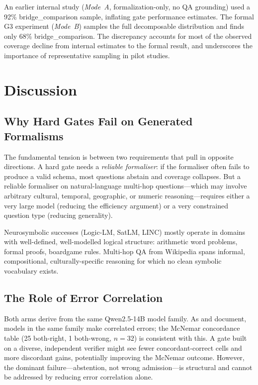 \documentclass[11pt]{article}
\newcommand{\mcnem}{McNemar}
\begin{document}
An earlier internal study (\emph{Mode~A}, formalization-only, no QA
grounding) used a 92\% bridge\_comparison sample, inflating gate
performance estimates.  The formal G3 experiment (\emph{Mode~B}) samples
the full decomposable distribution and finds only 68\% bridge\_comparison.
The discrepancy accounts for most of the observed coverage decline from
internal estimates to the formal result, and underscores the importance of
representative sampling in pilot studies.

\section{Discussion}
\label{sec:discussion}

\subsection{Why Hard Gates Fail on Generated Formalisms}

The fundamental tension is between two requirements that pull in opposite
directions.  A hard gate needs a \emph{reliable formaliser}: if the
formaliser often fails to produce a valid schema, most questions abstain and
coverage collapses.  But a reliable formaliser on natural-language multi-hop
questions---which may involve arbitrary cultural, temporal, geographic, or
numeric reasoning---requires either a very large model (reducing the
efficiency argument) or a very constrained question type (reducing generality).

Neurosymbolic successes (Logic-LM, SatLM, LINC) mostly operate in domains
with well-defined, well-modelled logical structure: arithmetic word problems,
formal proofs, boardgame rules.  Multi-hop QA from Wikipedia spans informal,
compositional, culturally-specific reasoning for which no clean symbolic
vocabulary exists.

\subsection{The Role of Error Correlation}

Both arms derive from the same Qwen2.5-14B model family.  As
\citet{correlatedErrors} and \citet{llmsJury} document, models in the same
family make correlated errors; the \mcnem{} concordance table (25 both-right,
1 both-wrong, $n{=}32$) is consistent with this.  A gate built on a diverse,
independent verifier might see fewer concordant-correct cells and more
discordant gains, potentially improving the \mcnem{} outcome.  However,
the dominant failure---abstention, not wrong admission---is structural
and cannot be addressed by reducing error correlation alone.
\end{document}

